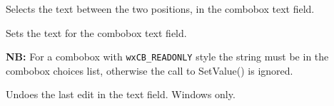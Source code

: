 Selects the text between the two positions, in the combobox text field.






\label{wxcomboboxsetvalue}


Sets the text for the combobox text field.

{\bf NB:} For a combobox with {\tt wxCB\_READONLY} style the string must be in
the combobox choices list, otherwise the call to SetValue() is ignored.




\label{wxcomboboxundo}


Undoes the last edit in the text field. Windows only.

